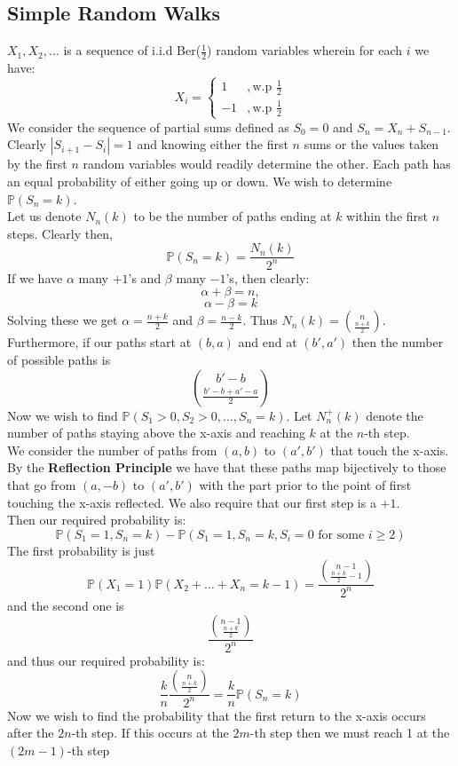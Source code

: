 \documentclass{article}
\begin{document}
\subsection{Simple Random Walks}
$X_1,X_2,\dots$ is a sequence of i.i.d Ber($\frac{1}{2}$) random variables wherein for each $i$ we have:
$$X_i=
\begin{cases}
1 &,\text{w.p } \frac{1}{2}\\
-1 &,\text{w.p } \frac{1}{2}
\end{cases}
$$
We consider the sequence of partial sums defined as $S_0=0$ and $S_n=X_n+S_{n-1}$.\\
Clearly $|S_{i+1}-S_i|=1$ and knowing either the first $n$ sums or the values taken by the first $n$ random variables would readily determine the other.
Each path has an equal probability of either going up or down. We wish to determine $\mathbb{P}(S_n=k)$.\\
Let us denote $N_n(k)$ to be the number of paths ending at $k$ within the first $n$ steps. Clearly then, $$\mathbb{P}(S_n=k)=\frac{N_n(k)}{2^n}$$
If we have $\alpha$ many $+1$'s and $\beta$ many $-1$'s, then clearly:
$$\alpha+\beta=n,$$
$$\alpha-\beta=k$$
Solving these we get $\alpha=\frac{n+k}{2}$ and $\beta=\frac{n-k}{2}$. 
Thus $N_n(k)=\binom{n}{\frac{n+k}{2}}$.
Furthermore, if our paths start at $(b,a)$ and end at $(b',a')$ then the number of possible paths is $$\binom{b'-b}{\frac{b'-b+a'-a}{2}}$$
Now we wish to find $\mathbb{P}(S_1>0,S_2>0,\dots,S_n=k)$. Let $N^{+}_n(k)$ denote the number of paths staying above the x-axis and reaching $k$ at the $n$-th step.\\
We consider the number of paths from $(a,b)$ to $(a',b')$ that touch the x-axis. By the \textbf{Reflection Principle} we have that these paths map bijectively to those that go from $(a,-b)$ to $(a',b')$ with the part prior to the point of first touching the x-axis reflected.
We also require that our first step is a $+1$. \\
Then our required probability is:
$$\mathbb{P}(S_1=1,S_n=k)-\mathbb{P}(S_1=1,S_n=k,S_i=0 \text{ for some }i\geq 2)$$
The first probability is just $$\mathbb{P}(X_1=1)\mathbb{P}(X_2+\dots+X_n=k-1)=\frac{\binom{n-1}{\frac{n+k}{2}-1}}{2^n}$$
and the second one is $$\frac{\binom{n-1}{\frac{n+k}{2}}}{2^n}$$
and thus our required probability is:
$$\frac{k}{n}\frac{\binom{n}{\frac{n+k}{2}}}{2^n}=\frac{k}{n}\mathbb{P}(S_n=k)$$
Now we wish to find the probability that the first return to the x-axis occurs after the $2n$-th step. If this occurs at the $2m$-th step then we must reach 1 at the $(2m-1)$-th step 
\end{document}
